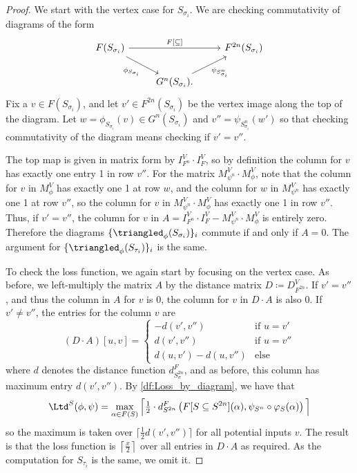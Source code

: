 \begin{proof}
We start with the vertex case for $S_{\sigma_i}$. 
We are checking commutativity of diagrams of the form 
\begin{equation*}
    \begin{tikzcd}
        F(S_{\sigma_i}) 
            \ar[rr, "{F[ \subseteq ]}"]   
            \ar[dr, "\phi_{S_{\sigma_i}}"'] 
            & & F^{2n}(S_{\sigma_i})
        \\
        & G^n(S_{\sigma_i})\ar[ur, "\psi_{S^n_{\sigma_i}}"'].  & 
    \end{tikzcd}
\end{equation*}
Fix a $v \in F(S_{\sigma_i})$, and let $v' \in F^{2n}(S_{\sigma_i})$ be the vertex image along the top of the diagram. 
Let $w = \phi_{S_{\sigma_i}}(v) \in G^n(S_{\sigma_i})$ and $v'' = \psi_{S_{\sigma_i}^n}(w')$ so that checking commutativity of the diagram means checking if $v' = v''$. 

The top map is given in matrix form by $I_{F^n}^V \cdot I_F^V$, so by definition the column for $v$ has exactly one entry 1 in row $v''$. 
For the matrix $M_{\psi^n}^V\cdot M_{\phi}^V$, note that 
the column for $v$ in $M_{\phi}^V$ has exactly one 1 at row $w$, and 
the column for $w$ in $M_{\psi^n}^V$ has exactly one 1 at row $v''$, so the column for $v$ in $M_{\psi^n}^V\cdot M_{\phi}^V$ has exactly one 1 in row $v''$. 
Thus, if $v' = v''$, the column for $v$ in $A = I_{F^n}^V \cdot I_F^V - M_{\psi^n}^V\cdot M_{\phi}^V $ is entirely zero.
Therefore the diagrams $\{\triangled_\phi(S_{\sigma_i})\}_i$ commute if and only if $A = 0$. 
The argument for $\{\triangled_\phi(S_{\tau_i})\}_i$ is the same.

To check the loss function, we again start by focusing on the vertex case. 
As before, we left-multiply the matrix $A$ by the distance matrix $D\coloneqq D_{F^{2n}}^V$.
If $v' = v''$, and thus the column in $A$ for $v$ is 0, the column for $v$ in $D \cdot A$ is also 0. 
If $v' \neq v''$, the entries for the column $v$ are 
\begin{equation*}
(D \cdot A)[u,v] = 
\begin{cases}
    -d(v',v'') & \text{if } u = v'\\
    d(v',v'') & \text{if } u = v'' \\
    d(u,v') - d(u,v'') & \text{else}
\end{cases}
\end{equation*}
where $d$ denotes the distance function $d^{F}_{S^{2n}_\sigma}$, and as before, this column has maximum entry $d(v',v'')$. 
By \cref{df:Loss_by_diagram}, we have that 
\begin{equation*}
\Ltd^S (\phi,\psi)
    = \max\limits_{\alpha \in F(S)}  \Big \lceil \tfrac{1}{2} \cdot d_{S^{2n}}^{F}\left(
    F[S \subseteq S^{2n}] (\alpha),
    \psi_{S^n} \circ \varphi_S(\alpha)
    \right) \Big \rceil
\end{equation*}
so the maximum is taken over $\lceil \tfrac{1}{2} d(v',v'')\rceil$ for all potential inputs $v$. 
The result is that the loss function is $\left\lceil\tfrac{x}{2}\right\rceil$ over all entries in $D \cdot A$ as required. 
As the computation for $S_{\tau_i}$ is the same, we omit it. 
\end{proof}
